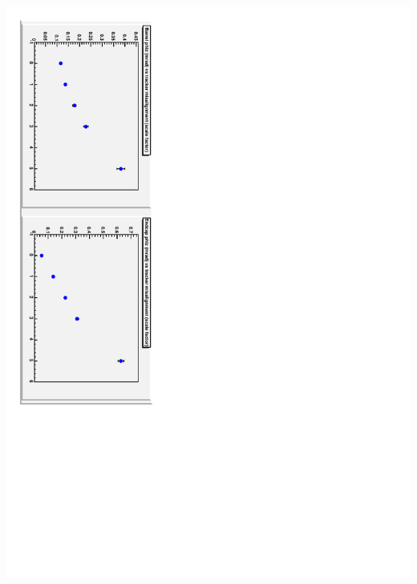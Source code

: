 \documentclass[compress]{beamer}
\begin{document}
\begin{frame}
\begin{columns}
\includegraphics[height=\linewidth, angle=90]{tracker_phiz_rmsonly.pdf}
\end{columns}
\end{frame}
\end{document}
